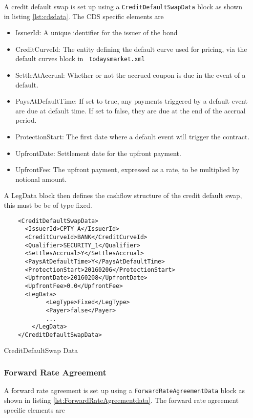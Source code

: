 A credit default swap is set up using a {\tt CreditDefaultSwapData} block as shown in listing \ref{lst:cdsdata}. The CDS specific elements
are

\begin{itemize}
\item IssuerId: A unique identifier for the issuer of the bond
\item CreditCurveId: The entity defining the default curve used for pricing, via the default curves block in {\tt
    todaysmarket.xml}
\item SettleAtAccrual: Whether or not the accrued coupon is due in the event of a default.
\item PaysAtDefaultTime: If set to true, any payments triggered by a default event are due at default time. If set to false, they are due at the end of the accrual period.
\item ProtectionStart: The first date where a default event will trigger the contract.
\item UpfrontDate: Settlement date for the upfront payment.
\item UpfrontFee: The upfront payment, expressed as a rate, to be multiplied by notional amount.
\end{itemize}

A LegData block then defines the cashflow structure of the credit default swap, this must be be of type fixed.

\begin{listing}[H]
\begin{verbatim}
    <CreditDefaultSwapData>
      <IssuerId>CPTY_A</IssuerId>
      <CreditCurveId>BANK</CreditCurveId>
      <Qualifier>SECURITY_1</Qualifier>
      <SettlesAccrual>Y</SettlesAccrual>
      <PaysAtDefaultTime>Y</PaysAtDefaultTime>
      <ProtectionStart>20160206</ProtectionStart>
      <UpfrontDate>20160208</UpfrontDate>
      <UpfrontFee>0.0</UpfrontFee>
      <LegData>
            <LegType>Fixed</LegType>
            <Payer>false</Payer>
            ...
        </LegData>
    </CreditDefaultSwapData>
\end{verbatim}
\caption{CreditDefaultSwap Data}
\label{lst:cdsdata}
\end{listing}

\subsubsection{Forward Rate Agreement}

A forward rate agreement is set up using a {\tt ForwardRateAgreementData} block as shown in listing \ref{lst:ForwardRateAgreementdata}. The forward rate agreement specific elements
are

